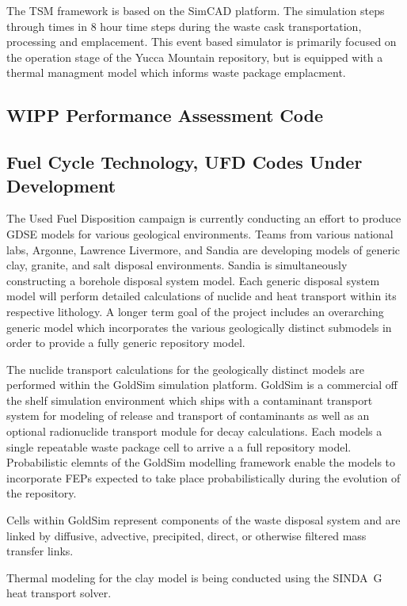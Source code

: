 The TSM framework is based on the SimCAD platform. The simulation steps through
times in 8 hour time steps during the waste cask transportation, processing and
emplacement. This event based simulator is primarily focused on the operation
stage of the Yucca Mountain repository, but is equipped with a thermal
managment model which informs waste package emplacment.

\subsection{WIPP Performance Assessment Code}

\subsection{Fuel Cycle Technology, UFD Codes Under Development}

The Used Fuel Disposition campaign is currently conducting an effort to produce
\gls{GDSE} models for various geological environments. Teams from
various national labs, Argonne, Lawrence Livermore, and Sandia are developing
models of generic clay, granite,   and salt disposal environments. Sandia is
simultaneously constructing  a borehole disposal system model. Each generic
disposal system model will perform detailed calculations of nuclide  and heat
transport within its respective lithology. A longer term goal of the project 
includes an overarching generic model which incorporates the various 
geologically distinct submodels in order to provide a fully generic repository 
model. 

The nuclide transport calculations for the geologically distinct models 
are performed within the GoldSim simulation platform. GoldSim is a commercial
off the shelf simulation environment which ships with a contaminant transport 
system for modeling of release and transport of contaminants as well as an 
optional radionuclide transport module for decay calculations. Each models a 
single repeatable waste package cell to arrive a a full repository model. 
Probabilistic elemnts of the GoldSim modelling framework enable the models to 
incorporate \gls{FEPs} expected to take place probabilistically during the 
evolution of the repository.  

Cells within GoldSim represent components of the waste disposal system and
are linked by diffusive, advective, precipited, direct, or  otherwise filtered
mass transfer links. 

Thermal modeling for the clay model is being conducted using the SINDA\ G heat
transport solver.  

